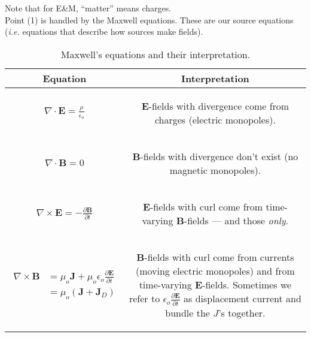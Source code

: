 \documentclass{article}
\numberwithin{equation}{section}
\begin{document}
Note that for E\&M, ``matter'' means charges. \\

Point (1) is handled by the Maxwell equations. These are our source equations (\emph{i.e.} equations that describe how sources make fields).

\begin{table}[H]
\centering
{}
\caption*{Maxwell's equations and their interpretation.}
\begin{tabular}{@{}c|c@{}}
\toprule
Equation & Interpretation \\ \midrule
{\parbox[c]{0.3\linewidth}{\begin{gather*} \nabla \cdot \bm{E} = \frac{\rho}{\epsilon_o} \end{gather*}}} & {\parbox[c]{0.6\linewidth}{\begin{center} $\bm{E}$-fields with divergence come from charges (electric monopoles). \end{center}}} \\ \midrule
{\parbox[c]{0.3\linewidth}{\begin{gather*} \nabla \cdot \bm{B} = 0 \end{gather*}}} & {\parbox[c]{0.6\linewidth}{\begin{center} $\bm{B}$-fields with divergence don't exist (no magnetic monopoles). \end{center}}} \\ \midrule
{\parbox[c]{0.3\linewidth}{\begin{gather*} \nabla \times \bm{E} = -\frac{\partial \bm{B}}{\partial t} \end{gather*}}} & {\parbox[c]{0.6\linewidth}{\begin{center} $\bm{E}$-fields with curl come from time-varying $\bm{B}$-fields --- and those \emph{only}. \end{center}}} \\ \midrule
{\parbox[c]{0.3\linewidth}{\begin{align*} \nabla \times \bm{B} &= \mu_o \bm{J} + \mu_o \epsilon_o \frac{\partial \bm{E}}{\partial t} \\ &= \mu_o \left( \bm{J} + \bm{J}_D \right) \end{align*}}} & {\parbox[c]{0.6\linewidth}{\begin{center} $\bm{B}$-fields with curl come from currents (moving electric monopoles) and from time-varying $\bm{E}$-fields. Sometimes we refer to $\epsilon_o \frac{\partial \bm{E}}{\partial t}$ as displacement current and bundle the $J$'s together. \end{center}}} \\ \bottomrule
\end{tabular}
\label{tab:1:maxwell}
\end{table}
\end{document}
